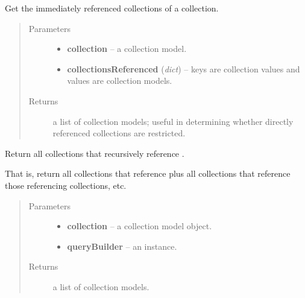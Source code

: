 \documentclass[letterpaper,10pt,english]{sphinxmanual}
\begin{document}
\begin{fulllineitems}
\label{api:onlinelinguisticdatabase.controllers.oldcollections.getCollectionsReferencedInContents}
Get the immediately referenced collections of a collection.
\begin{quote}\begin{description}
\item[{Parameters}] \leavevmode\begin{itemize}
\item {} 
\textbf{collection} -- a collection model.

\item {} 
\textbf{collectionsReferenced} (\emph{dict}) -- keys are collection  values and 
values are collection models.

\end{itemize}

\item[{Returns}] \leavevmode
a list of collection models; useful in determining whether
directly referenced collections are restricted.

\end{description}\end{quote}

\end{fulllineitems}


\begin{fulllineitems}
\label{api:onlinelinguisticdatabase.controllers.oldcollections.getCollectionsReferencingThisCollection}
Return all collections that recursively reference .

That is, return all collections that reference  plus all
collections that reference those referencing collections, etc.
\begin{quote}\begin{description}
\item[{Parameters}] \leavevmode\begin{itemize}
\item {} 
\textbf{collection} -- a collection model object.

\item {} 
\textbf{queryBuilder} -- an  instance.

\end{itemize}

\item[{Returns}] \leavevmode
a list of collection models.

\end{description}\end{quote}

\end{fulllineitems}
\end{document}
